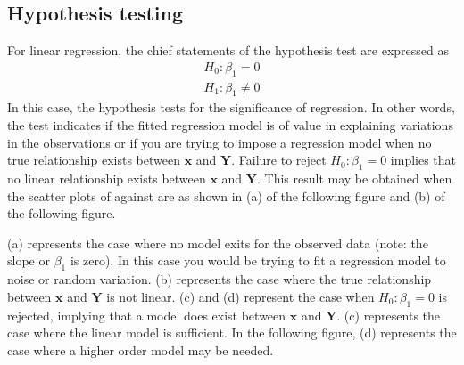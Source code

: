 \documentclass[11pt]{article}
\theoremstyle{remark}
\begin{document}
\pagebreak
\subsection{Hypothesis testing}
For linear regression, the chief statements of the hypothesis test are expressed as
\begin{eqnarray}
H_0: \beta_1 = 0\nonumber\\
H_1: \beta_1 \ne 0
\end{eqnarray}
In this case, the hypothesis tests for the significance of regression. In other words, the test indicates if the fitted regression model is of value in explaining variations in the observations or if you are trying to impose a regression model when no true relationship exists between $\mathbf{x}$ and $\mathbf{Y}$. Failure to reject $H_0: \beta_1 = 0$ implies that no linear relationship exists between $\mathbf{x}$ and $\mathbf{Y}$. This result may be obtained when the scatter plots of against are as shown in (a) of the following figure and (b) of the following figure.

\begin{figure}[h]
      \end{figure}

(a) represents the case where no model exits for the observed data (note: the slope or $\beta_1$ is zero). In this case you would be trying to fit a regression model to noise or random variation. (b) represents the case where the true relationship between $\mathbf{x}$ and $\mathbf{Y}$ is not linear. (c) and (d) represent the case when $H_0: \beta_1 = 0$ is rejected, implying that a model does exist between $\mathbf{x}$ and $\mathbf{Y}$. (c) represents the case where the linear model is sufficient. In the following figure, (d) represents the case where a higher order model may be needed.
\end{document}
